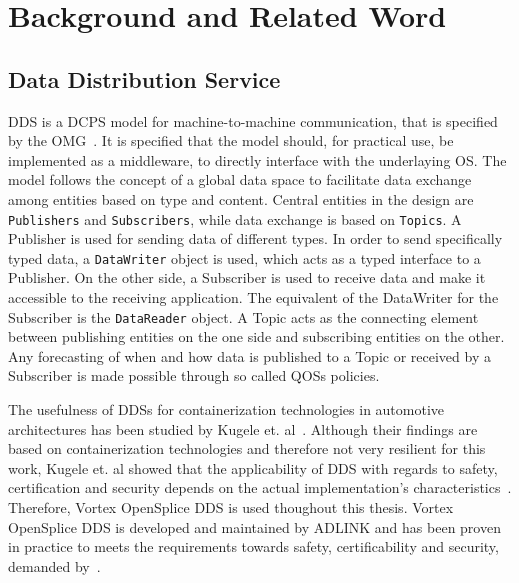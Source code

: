 \chapter{Background and Related Word}
\label{chptr:concepts}


\section{Data Distribution Service}
\Gls*{DDS} is a \gls*{DCPS} model for machine-to-machine communication, that is specified by the \gls*{OMG}~\cite{omgDDSspec}.
It is specified that the model should, for practical use, be implemented as a middleware, to directly interface with the underlaying \gls*{OS}.
The model follows the concept of a global data space to facilitate data exchange among entities based on type and content.
Central entities in the design are \texttt{Publishers} and \texttt{Subscribers}, while data exchange is based on \texttt{Topics}.
A Publisher is used for sending data of different types.
In order to send specifically typed data, a \texttt{DataWriter} object is used, which acts as a typed interface to a Publisher.
On the other side, a Subscriber is used to receive data and make it accessible to the receiving application.
The equivalent of the DataWriter for the Subscriber is the \texttt{DataReader} object.
A Topic acts as the connecting element between publishing entities on the one side and subscribing entities on the other.
Any forecasting of when and how data is published to a Topic or received by a Subscriber is made possible through so called \glspl*{QOS} policies.

The usefulness of \glspl*{DDS} for containerization technologies in automotive architectures has been studied by Kugele et. al~\cite{KugeleDataCentricForAuto}.
Although their findings are based on containerization technologies and therefore not very resilient for this work, Kugele et. al showed that the applicability of \gls*{DDS} with regards to safety, certification and security depends on the actual implementation's characteristics~\cite{KugeleDataCentricForAuto}.
Therefore, Vortex OpenSplice DDS is used thoughout this thesis.
Vortex OpenSplice DDS is developed and maintained by ADLINK and has been proven in practice to meets the requirements towards safety, certificability and security, demanded by~\cite{KugeleDataCentricForAuto}.

